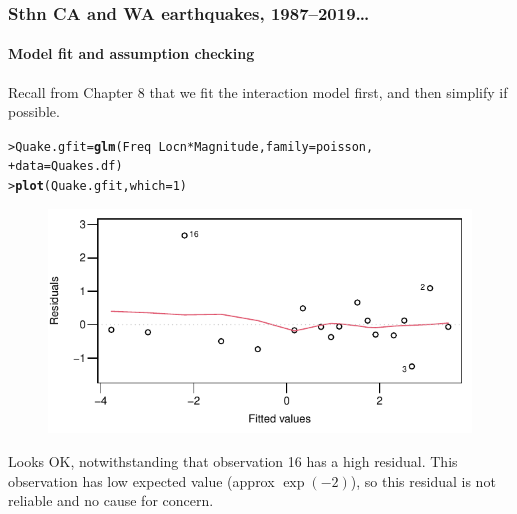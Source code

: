 \documentclass{beamer}\usepackage[]{graphicx}\usepackage[]{xcolor}
\makeatletter
\newcommand{\hlnum}[1]{\textcolor[rgb]{0.686,0.059,0.569}{#1}}%
\newcommand{\hlopt}[1]{\textcolor[rgb]{0,0,0}{#1}}%
\newcommand{\hlstd}[1]{\textcolor[rgb]{0.345,0.345,0.345}{#1}}%
\newcommand{\hlkwb}[1]{\textcolor[rgb]{0.69,0.353,0.396}{#1}}%
\newcommand{\hlkwc}[1]{\textcolor[rgb]{0.333,0.667,0.333}{#1}}%
\newcommand{\hlkwd}[1]{\textcolor[rgb]{0.737,0.353,0.396}{\textbf{#1}}}%
\newenvironment{kframe}{%
 \def\at@end@of@kframe{}%
 \ifinner\ifhmode%
  \def\at@end@of@kframe{\end{minipage}}%
  \begin{minipage}{\columnwidth}%
 \fi\fi%
 \def\FrameCommand##1{\hskip\@totalleftmargin \hskip-\fboxsep
 \colorbox{shadecolor}{##1}\hskip-\fboxsep
     \hskip-\linewidth \hskip-\@totalleftmargin \hskip\columnwidth}%
 \MakeFramed {\advance\hsize-\width
   \@totalleftmargin\z@ \linewidth\hsize
   \@setminipage}}%
 {\par\unskip\endMakeFramed%
 \at@end@of@kframe}
\newenvironment{knitrout}{}{} %
\makeatother
\begin{document}
\begin{frame}[fragile]
\frametitle{Sthn CA and WA earthquakes, 1987--2019\ldots}
\framesubtitle{Model fit and assumption checking}
Recall from Chapter 8 that we fit the interaction model first, and then simplify if possible.

\begin{knitrout}\scriptsize
{}\color{fgcolor}\begin{kframe}
\begin{alltt}
\hlstd{> }\hlstd{Quake.gfit} \hlkwb{=} \hlkwd{glm}\hlstd{(Freq} \hlopt{~} \hlstd{Locn} \hlopt{*} \hlstd{Magnitude,} \hlkwc{family} \hlstd{= poisson,}
\hlstd{+ }                 \hlkwc{data} \hlstd{= Quakes.df)}
\hlstd{> }\hlkwd{plot}\hlstd{(Quake.gfit,} \hlkwc{which} \hlstd{=} \hlnum{1}\hlstd{)}
\end{alltt}
\end{kframe}
\end{knitrout}



\begin{figure}
  \centering
  \includegraphics[scale=0.7]{figure/RC-H14-007}
\end{figure}

Looks OK, notwithstanding that observation 16 has a high residual. This observation has low expected value (approx $\exp(-2)$), so this residual is not reliable and no cause for concern. 
\end{frame}
\end{document}
